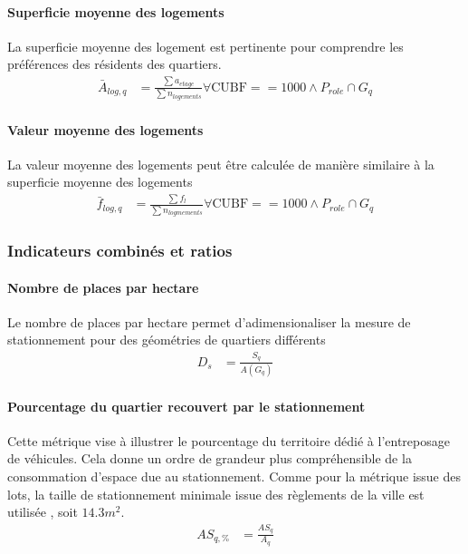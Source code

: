     \paragraph{Superficie moyenne des logements} La superficie moyenne des logement est pertinente pour comprendre les préférences des résidents des quartiers.
    \begin{align}
        \bar{A}_{log,q} &= \frac{\sum{a_{etage}}}{\sum{n_{logements}}} \forall \text{CUBF} ==1000 \wedge P_{role} \cap G_q
    \end{align}
    \paragraph{Valeur moyenne des logements} La valeur moyenne des logements peut être calculée de manière similaire à la superficie moyenne des logements
    \begin{align}
        \bar{f}_{log,q} &= \frac{\sum{f_l}}{\sum{n_{logmements}}} \forall \text{CUBF} ==1000 \wedge P_{role} \cap G_q
    \end{align}
    
    \subsubsection{Indicateurs combinés et ratios}
    \paragraph{Nombre de places par hectare} Le nombre de places par hectare permet d'adimensionaliser la mesure de stationnement pour des géométries de quartiers différents
    \begin{align}
        D_s &= \frac{S_q}{A(G_q)}
    \end{align}
    \paragraph{Pourcentage du quartier recouvert par le stationnement} Cette métrique vise à illustrer le pourcentage du territoire dédié à l'entreposage de véhicules. Cela donne un ordre de grandeur plus compréhensible de la consommation d'espace due au stationnement. Comme pour la métrique issue des lots, la taille de stationnement minimale issue des règlements de la ville est utilisée \parencite{ville_de_quebec_reglement_2009}, soit $14.3m^{2}$.
    \begin{align}
        AS_{q,\%} &= \frac{AS_{q}}{A_q}
    \end{align}
